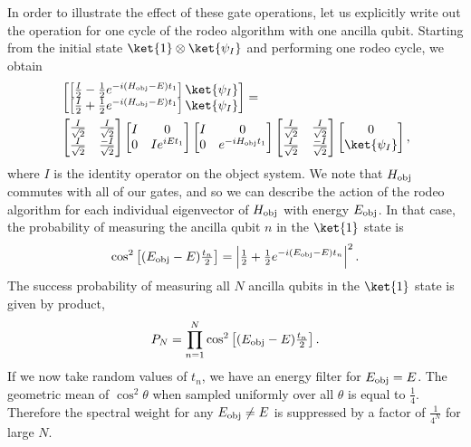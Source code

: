 In order to illustrate the effect of these gate operations, let us explicitly write out the operation for one cycle of the rodeo algorithm with one ancilla qubit.  Starting from the initial state $\ket{1} \otimes \ket{\psi_I}$ and performing one rodeo cycle, we obtain
\begin{align}
& \begin{bmatrix}
\left[ \tfrac{I}{2}-\tfrac{1}{2}e^{-i(H_{\rm obj}-E)t_1} \right] \ket{\psi_I} \\
\left[ \tfrac{I}{2}+\tfrac{1}{2}e^{-i(H_{\rm obj}-E)t_1} \right] \ket{\psi_I}
\end{bmatrix} =  \nonumber \\
& \begin{bmatrix}
\tfrac{I}{\sqrt{2}} &
\tfrac{I}{\sqrt{2}}\\
\tfrac{I}{\sqrt{2}}& 
\tfrac{-I}{\sqrt{2}}
\end{bmatrix}
\begin{bmatrix}
 I & 0 \\
0 & Ie^{iEt_1} 
\end{bmatrix}
 \begin{bmatrix}
 I & 0 \\
0 & e^{-iH_{\rm obj}t_1}
\end{bmatrix} 
\begin{bmatrix}
\tfrac{I}{\sqrt{2}} & 
\tfrac{I}{\sqrt{2}}\\
\tfrac{I}{\sqrt{2}} & 
\tfrac{-I}{\sqrt{2}}
\end{bmatrix}
\begin{bmatrix}
0 \\
\ket{\psi_I}
\end{bmatrix},
\label{one_rodeo}
\end{align}
where $I$ is the identity operator on the object system.
We note that $H_{\rm obj}$ commutes with all of our gates, and so we can describe the action of the rodeo algorithm for each individual eigenvector of $H_{\rm obj}$ with energy $E_{\rm obj}$.  In that case, the probability of measuring the ancilla qubit $n$ in the $\ket{1}$ state is 
\begin{equation}
   \cos^2\left[(E_{\rm obj}
   -E)\tfrac{t_n}{2}\right] = \left\vert \tfrac{1}{2}+
   \tfrac{1}{2}e^{-i(E_{\rm obj}-E)t_n} \right\vert^2.
\end{equation}
The success probability of measuring all $N$ ancilla qubits in the $\ket{1}$ state is given by product, 
\begin{equation}
   P_N =\prod_{n=1}^N \cos^2\left[(E_{\rm obj}
   -E)\tfrac{t_n}{2}\right]. \label{prob}
\end{equation}
If we now take random values of $t_n$, we have an energy filter for $E_{\rm obj}=E$.  The geometric mean of $\cos^2\theta$ when sampled uniformly over all $\theta$ is equal to $\tfrac{1}{4}$.  Therefore the spectral weight for any $E_{\rm obj}\ne E$ is suppressed by a factor of $\tfrac{1}{4^N}$ for large $N$.

